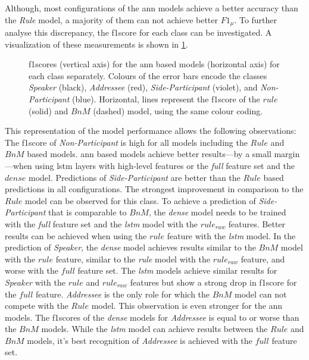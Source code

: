 Although, most configurations of the \gls{ann} models achieve a better \gls{accuracy} than the \emph{Rule} model, a majority of them can not achieve better \(F1_\mu\).
To further analyse this discrepancy, the \gls{f1score} for each class can be investigated.
A visualization of these measurements is shown in \cref{fig:role-nn-f1-class}.
\begin{figure}[htbp]
    \centering
    \begin{footnotesize}
    
    \end{footnotesize}
    \caption[Class-wise performance of ANN models.]{\label{fig:role-nn-f1-class} 
    \Glspl{f1score} (vertical axis) for the \gls{ann} based models (horizontal axis) for each class separately.
    Colours of the error bars encode the classes \emph{Speaker} (black), \emph{Addressee} (red), \emph{Side-Participant} (violet), and \emph{Non-Participant} (blue).
    Horizontal, lines represent the \gls{f1score} of the \(rule\) (solid) and \(BnM\) (dashed) model, using the same colour coding.
    }
\end{figure}
This representation of the model performance allows the following observations:
%
The \gls{f1score} of \emph{Non-Participant} is high for all models including the \(Rule\) and \(BnM\) based models.
\Gls{ann} based models achieve better results---by a small margin---when using \gls{lstm} layers with high-level features or the \emph{full} feature set and the \(dense\) model.
%
Predictions of \emph{Side-Participant} are better than the \(Rule\) based predictions in all configurations.
The strongest improvement in comparison to the \(Rule\) model can be observed for this class.
To achieve a prediction of \emph{Side-Participant} that is comparable to \(BnM\), the \emph{dense} model needs to be trained with the \emph{full} feature set and the \emph{lstm} model with the \(rule_{raw}\) features.
Better results can be achieved when using the \(rule\) feature with the \emph{lstm} model.
%
In the prediction of \emph{Speaker}, the \emph{dense} model achieves results similar to the \(BnM\) model with the \(rule\) feature, similar to the \emph{rule} model with the \(rule_{raw}\) feature, and worse with the \(full\) feature set.
The \emph{lstm} models achieve similar results for \emph{Speaker} with the \(rule\) and \(rule_{raw}\) features but show a strong drop in \gls{f1score} for the \(full\) feature.
%
\emph{Addressee} is the only role for which the \(BnM\) model can not compete with the \(Rule\) model.
This observation is even stronger for the \gls{ann} models.
The \glspl{f1score} of the \emph{dense} models for \emph{Addressee} is equal to or worse than the \(BnM\) models.
While the \emph{lstm} model can achieve results between the \(Rule\) and \(BnM\) models, it's best recognition of \emph{Addressee} is achieved with the \(full\) feature set.


